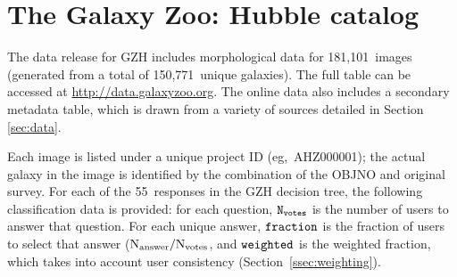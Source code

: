 \documentclass[twocolumn]{aastex6}
\begin{document}
%
%
%
%
%
%
%

\section{The Galaxy Zoo: Hubble catalog}\label{sec:results}

The data release for GZH includes morphological data for 181,101~images (generated from a total of 150,771~unique galaxies). The full table can be accessed at \url{http://data.galaxyzoo.org}. The online data also includes a secondary metadata table, which is drawn from a variety of sources detailed in Section \ref{sec:data}.

Each image is listed under a unique project ID (eg,~AHZ000001); the actual galaxy in the image is identified by the combination of the OBJNO and original survey. For each of the 55~responses in the GZH decision tree, the following classification data is provided: for each question, $\tt N_{votes}$ is the number of users to answer that question. For each unique answer, $\tt fraction$ is the fraction of users to select that answer ($\rm N_{answer}/N_{votes}$, and $\tt weighted$ is the weighted fraction, which takes into account user consistency (Section~\ref{ssec:weighting}). 
\end{document}
